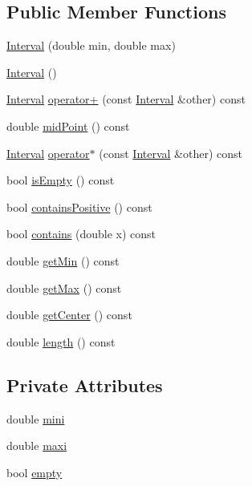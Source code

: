 \subsection*{Public Member Functions}
\begin{DoxyCompactItemize}
\item 
\mbox{\hyperlink{classInterval_ab0a8f191fb00803d529902f85524e4e2}{Interval}} (double min, double max)
\item 
\mbox{\hyperlink{classInterval_ae48b9a9e9f672f81977627b609e32429}{Interval}} ()
\item 
\mbox{\hyperlink{classInterval}{Interval}} \mbox{\hyperlink{classInterval_a63d00f59b958c3c0c126daceb3479a97}{operator+}} (const \mbox{\hyperlink{classInterval}{Interval}} \&other) const
\item 
double \mbox{\hyperlink{classInterval_a8e8d9961ecc6ac0d76162f4a8e15d553}{mid\+Point}} () const
\item 
\mbox{\hyperlink{classInterval}{Interval}} \mbox{\hyperlink{classInterval_aba632e788297e13c87edf078312d38b2}{operator$\ast$}} (const \mbox{\hyperlink{classInterval}{Interval}} \&other) const
\item 
bool \mbox{\hyperlink{classInterval_abbee4d022a104dbeda34f1e02942536c}{is\+Empty}} () const
\item 
bool \mbox{\hyperlink{classInterval_a779a20722679c08c08f720a0fe3231fe}{contains\+Positive}} () const
\item 
bool \mbox{\hyperlink{classInterval_a303cb6f65a8e98d64fa0bb88cc03ed50}{contains}} (double x) const
\item 
double \mbox{\hyperlink{classInterval_ac899eee4bd4a58aff49b7f66f0faa0af}{get\+Min}} () const
\item 
double \mbox{\hyperlink{classInterval_a9a7833a07e551193309a13271c6e18ff}{get\+Max}} () const
\item 
double \mbox{\hyperlink{classInterval_a64e3d5481f199c38ef5e316da0617b30}{get\+Center}} () const
\item 
double \mbox{\hyperlink{classInterval_ad60d36e883307c5a82f500a1c2a9c876}{length}} () const
\end{DoxyCompactItemize}
\subsection*{Private Attributes}
\begin{DoxyCompactItemize}
\item 
double \mbox{\hyperlink{classInterval_aeb6ee750751e32a0f92d23f0a44ab122}{mini}}
\item 
double \mbox{\hyperlink{classInterval_ac086c91ab2c6f75ce8b3ff3818b38798}{maxi}}
\item 
bool \mbox{\hyperlink{classInterval_a9d9385e1ce6637e5760d26bf80aeada6}{empty}}
\end{DoxyCompactItemize}
